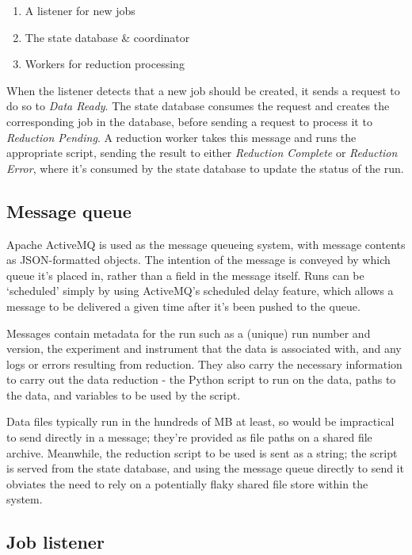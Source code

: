 \documentclass[twocolumn]{article}
\providecommand{\tightlist}{%
  \setlength{\itemsep}{0pt}\setlength{\parskip}{0pt}}
\begin{document}
\begin{enumerate}
\def\labelenumi{\arabic{enumi}.}
\tightlist
\item
  A listener for new jobs
\item
  The state database \& coordinator
\item
  Workers for reduction processing
\end{enumerate}

When the listener detects that a new job should be created, it sends a
request to do so to \emph{Data Ready}. The state database consumes the
request and creates the corresponding job in the database, before
sending a request to process it to \emph{Reduction Pending}. A reduction
worker takes this message and runs the appropriate script, sending the
result to either \emph{Reduction Complete} or \emph{Reduction Error},
where it's consumed by the state database to update the status of the
run.

\subsection{Message queue}\label{message-queue}

Apache ActiveMQ is used as the message queueing system, with message
contents as JSON-formatted objects. The intention of the message is
conveyed by which queue it's placed in, rather than a field in the
message itself. Runs can be `scheduled' simply by using ActiveMQ's
scheduled delay feature, which allows a message to be delivered a given
time after it's been pushed to the queue.

Messages contain metadata for the run such as a (unique) run number and
version, the experiment and instrument that the data is associated with,
and any logs or errors resulting from reduction. They also carry the
necessary information to carry out the data reduction - the Python
script to run on the data, paths to the data, and variables to be used
by the script.

Data files typically run in the hundreds of MB at least, so would be
impractical to send directly in a message; they're provided as file
paths on a shared file archive. Meanwhile, the reduction script to be
used is sent as a string; the script is served from the state database,
and using the message queue directly to send it obviates the need to
rely on a potentially flaky shared file store within the system.

\subsection{Job listener}\label{job-listener}
\end{document}
